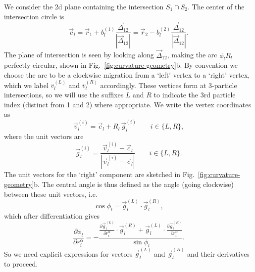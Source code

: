 \documentclass[11pt,twoside]{report}
\begin{document}
We consider the 2d plane containing the intersection $S_1 \cap S_2$.
The center of the intersection circle is
\begin{equation}
  \vec{c}_l
  = \vec{r}_1 + b_l^{(1)} \frac{\vec{\Delta}_{12}}{|\vec{\Delta}_{12}|}
  = \vec{r}_2 - b_l^{(2)} \frac{\vec{\Delta}_{12}}{|\vec{\Delta}_{12}|}.
\end{equation}
The plane of intersection is seen by looking along $\vec{\Delta}_{12}$, making the arc $\phi_l R_l$ perfectly circular, shown in Fig.\ \ref{fig:curvature-geometry}b.
By convention we choose the arc to be a clockwise migration from a `left' vertex to a `right' vertex, which we label $v_l^{(L)}$ and $v_l^{(R)}$ accordingly.
These vertices form at 3-particle intersections, so we will use the suffixes $L$ and $R$ to indicate the 3rd particle index (distinct from 1 and 2) where appropriate.
We write the vertex coordinates as
\begin{equation}
  \vec{v}_l^{(i)} = \vec{c}_l + R_l \, \vec{g}_l^{(i)} \qquad i \in \{L,R\},
\end{equation}
where the unit vectors are
\begin{equation}
  \vec{g}_l^{(i)} =
  \frac
  {\vec{v}_l^{(i)} - \vec{c}_l}
  {|\vec{v}_l^{(i)} - \vec{c}_l|}
  \qquad i \in \{L,R\}.
\end{equation}
The unit vectors for the `right' component are sketched in Fig.\ \ref{fig:curvature-geometry}b.
The central angle is thus defined as the angle (going clockwise) between these unit vectors, i.e.
\begin{equation}
  \cos{\phi_l} = \vec{g}_l^{(L)} \cdot \vec{g}_l^{(R)},
\end{equation}
which after differentiation gives
\begin{equation}
  \frac{\partial \phi_l}{\partial r_i^\alpha} =
  - \frac
  {\frac{\partial \vec{g}_l^{(L)}}{\partial r_i^\alpha} \cdot \vec{g}_l^{(R)} +
   \vec{g}_l^{(L)} \cdot \frac{\partial \vec{g}_l^{(R)}}{\partial r_i^\alpha}}
  {\sin{\phi_l}}.
\end{equation}
So we need explicit expressions for vectors $\vec{g}_l^{(L)}$ and $\vec{g}_l^{(R)}$ and their derivatives to proceed.
\end{document}

